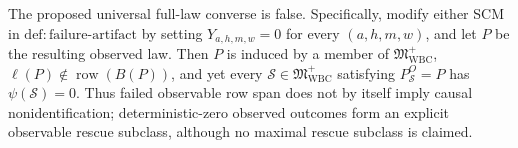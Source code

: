 The proposed universal full-law converse is false.  Specifically, modify either
SCM in \(\mathrm{def{:}failure\text{-}artifact}\) by setting
\(Y_{a,h,m,w}=0\) for every \((a,h,m,w)\), and let \(P\) be the resulting
observed law.  Then \(P\) is induced by a member of
\(\mathfrak M_{\mathrm{WBC}}^+\),
\(\ell(P)\notin\operatorname{row}(B(P))\), and yet every
\(\mathcal S\in\mathfrak M_{\mathrm{WBC}}^+\) satisfying
\(P_{\mathcal S}^O=P\) has \(\psi(\mathcal S)=0\).  Thus failed observable
row span does not by itself imply causal nonidentification; deterministic-zero
observed outcomes form an explicit observable rescue subclass, although no
maximal rescue subclass is claimed.